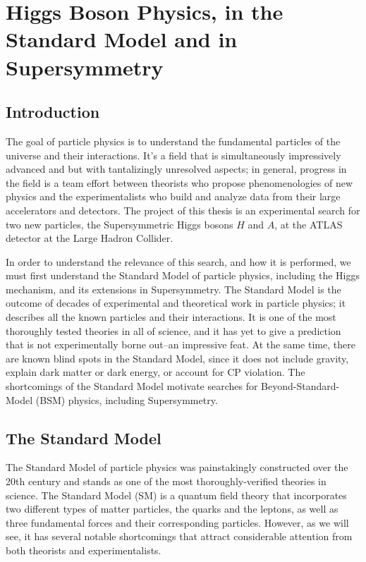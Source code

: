  

\chapter[Theory of Higgs Physics]{Higgs Boson Physics, in the Standard Model and in Supersymmetry}
\label{chapter:Theory}



\section{Introduction}
The goal of particle physics is to understand the fundamental particles of the universe and their interactions. It's a field that is simultaneously impressively advanced and but with tantalizingly unresolved aspects; in general, progress in the field is a team effort between theorists who propose phenomenologies of new physics and the experimentalists who build and analyze data from their large accelerators and detectors.  The project of this thesis is an experimental search for two new particles, the Supersymmetric Higgs bosons $H$ and $A$, at the ATLAS detector at the Large Hadron Collider.

In order to understand the relevance of this search, and how it is performed, we must first understand the Standard Model of particle physics, including the Higgs mechanism, and its extensions in Supersymmetry.  The Standard Model is the outcome of decades of experimental and theoretical work in particle physics; it describes all the known particles and their interactions.  It is one of the most thoroughly tested theories in all of science, and it has yet to give a prediction that is not experimentally borne out--an impressive feat.  At the same time, there are known blind spots in the Standard Model, since it does not include gravity, explain dark matter or dark energy, or account for CP violation.   The shortcomings of the Standard Model motivate searches for Beyond-Standard-Model (BSM) physics, including Supersymmetry.  


\section{The Standard Model}
The Standard Model of particle physics was painstakingly constructed over the 20th century and stands as one of the most thoroughly-verified theories in science.  The Standard Model (SM) is a quantum field theory that incorporates two different types of matter particles, the quarks and the leptons, as well as three fundamental forces and their corresponding particles.  However, as we will see, it has several notable shortcomings that attract considerable attention from both theorists and experimentalists.  

